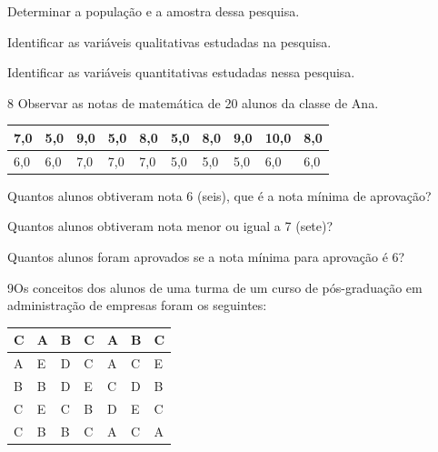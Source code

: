 \begin{escolha}
\item
  Determinar a população e a amostra dessa pesquisa.\\

\item
  Identificar as variáveis qualitativas estudadas na pesquisa.\\

\item
  Identificar as variáveis quantitativas estudadas nessa pesquisa.\\
\end{escolha}

\pagebreak
\num{8} Observar as notas de matemática de 20 alunos da classe de Ana.

\begin{longtable}[]{@{}llllllllll@{}}
\toprule
7,0 & 5,0 & 9,0 & 5,0 & 8,0 & 5,0 & 8,0 & 9,0 & 10,0 &
8,0\tabularnewline
\midrule
\endhead
6,0 & 6,0 & 7,0 & 7,0 & 7,0 & 5,0 & 5,0 & 5,0 & 6,0 & 6,0\tabularnewline
\bottomrule
\end{longtable}

\begin{escolha}
\item
  Quantos alunos obtiveram nota 6 (seis), que é a nota mínima de aprovação?\\

\item
  Quantos alunos obtiveram nota menor ou igual a 7 (sete)?\\

\item
  Quantos alunos foram aprovados se a nota mínima para aprovação é 6?\\
\end{escolha}

\pagebreak

\num{9}Os conceitos dos alunos de uma turma de um curso de pós-graduação
em administração de empresas foram os seguintes:

\begin{longtable}[]{@{}lllllll@{}}
\toprule
C & A & B & C & A & B & C\tabularnewline
\midrule
\endhead
A & E & D & C & A & C & E\tabularnewline
B & B & D & E & C & D & B\tabularnewline
C & E & C & B & D & E & C\tabularnewline
C & B & B & C & A & C & A\tabularnewline
\bottomrule
\end{longtable}

